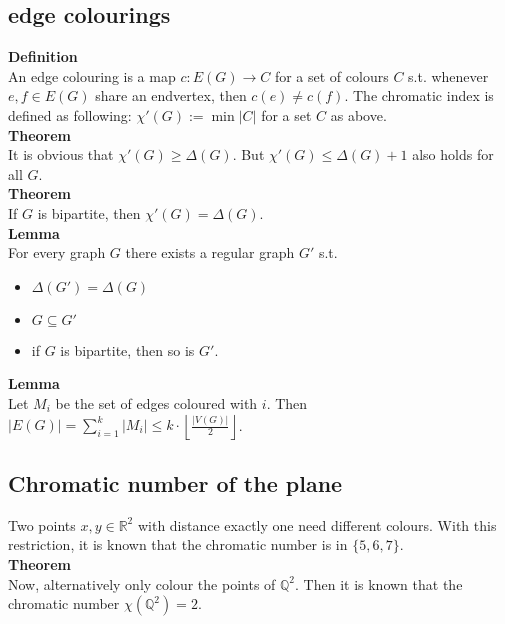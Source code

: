 \documentclass[a4paper, 12pt]{article}
\begin{document}
	\subsection{edge colourings}
	\textbf{Definition}\\
	An edge colouring is a map $c: E(G) \to C$ for a set of colours $C$ s.t. whenever $e,f \in E(G)$ share an endvertex, then $c(e)\neq c(f)$. The chromatic index is defined as following: $\chi'(G) := \min \left|C\right|$ for a set $C$ as above.\\
	\textbf{Theorem}\\
	It is obvious that $\chi'(G) \geq \Delta(G)$. But $\chi'(G) \leq \Delta(G)+1$ also holds for all $G$.\\
	\textbf{Theorem}\\
	If $G$ is bipartite, then $\chi'(G) = \Delta(G)$.\\
	\textbf{Lemma}\\
	For every graph $G$ there exists a regular graph $G'$ s.t. \begin{itemize}
		\item $\Delta(G') = \Delta(G)$
		\item $G\subseteq G'$
		\item if $G$ is bipartite, then so is $G'$.
	\end{itemize}
	\textbf{Lemma}\\
	Let $M_i$ be the set of edges coloured with $i$. Then $\left|E(G)\right| = \sum_{i=1}^{k} \left|M_i\right| \leq k\cdot \left\lfloor\frac{\left|V(G)\right|}{2}\right\rfloor$.
	\subsection{Chromatic number of the plane}
	Two points $x,y \in \mathbb{R}^2$ with distance exactly one need different colours. With this restriction, it is known that the chromatic number is in $\{5,6,7\}$.\\
	\textbf{Theorem}\\
	Now, alternatively only colour the points of $\mathbb{Q}^2$. Then it is known that the chromatic number $\chi(\mathbb{Q}^2) = 2$.
\end{document}
